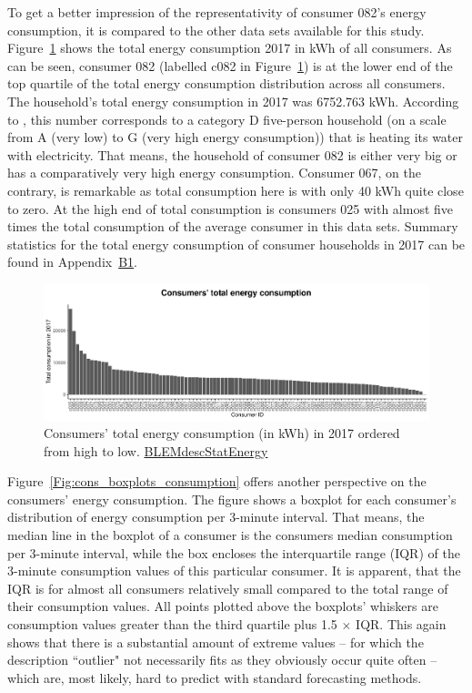 To get a better impression of the representativity of consumer 082's energy consumption, it is compared to the other data sets available for this study. Figure~\ref{Fig:cons_total_consumption} shows the total energy consumption 2017 in kWh of all consumers. As can be seen, consumer 082 (labelled c082 in Figure~\ref{Fig:cons_total_consumption}) is at the lower end of the top quartile of the total energy consumption distribution across all consumers. The household's total energy consumption in 2017 was 6752.763 kWh. According to \citet{Stromspiegel:2017}, this number corresponds to a category D five-person household (on a scale from A (very low) to G (very high energy consumption)) that is heating its water with electricity. That means, the household of consumer 082 is either very big or has a comparatively very high energy consumption. Consumer 067, on the contrary, is remarkable as total consumption here is with only 40 kWh quite close to zero. At the high end of total consumption is consumers 025 with almost five times the total consumption of the average consumer in this data sets. Summary statistics for the total energy consumption of consumer households in 2017 can be found in Appendix~\hyperlink{AppB1:Tables:totalcons}{B1}.

\begin{figure}[htbp]
 \centering
\includegraphics[width=\textwidth]{thesis/graphs/consumer_totalconsumption2.pdf}
\caption[Consumers' total energy consumption (in kWh) in 2017]{Consumers' total energy consumption (in kWh) in 2017 ordered from high to low. \quantnet\href{ }{BLEMdescStatEnergy}}
\label{Fig:cons_total_consumption}
\end{figure}

Figure~\ref{Fig:cons_boxplots_consumption} offers another perspective on the consumers' energy consumption. The figure shows a boxplot for each consumer's distribution of energy consumption per 3-minute interval. That means, the median line in the boxplot of a consumer is the consumers median consumption per 3-minute interval, while the box encloses the interquartile range (IQR) of the 3-minute consumption values of this particular consumer. It is apparent, that the IQR is for almost all consumers relatively small compared to the total range of their consumption values. All points plotted above the boxplots' whiskers are consumption values greater than the third quartile plus 1.5 $\times$ IQR. This again shows that there is a substantial amount of extreme values -- for which the description ``outlier" not necessarily fits as they obviously occur quite often -- which are, most likely, hard to predict with standard forecasting methods.

